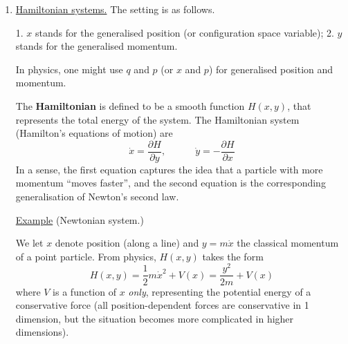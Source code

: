 \documentclass[11pt, letterpaper, oneside]{article}     %
\numberwithin{equation}{subsection}
\theoremstyle{definition}
\numberwithin{theorem}{section}
\theoremstyle{remark}
\begin{document}
\begin{enumerate}
  Now let us consider the exact solution curves to the nonlinear system. To solve for these, we find the autonomous system
  \begin{equation}
    \frac{dy}{dx} = \frac{dy/dt}{dx/dt} = \frac{y(-1+x)}{x(2-y)} = \left(\frac{y}{2-y}\right)\left(\frac{-1+x}{x}\right)
  \end{equation}
  Luckily, this equation is fairly easy to solve, as it is separable. We rearrange and simplify to get
  \begin{equation}
    \left(\frac{2}{y} - 1\right)dy = \left(\frac{-1}{x} + 1\right)dx,
  \end{equation}
  and integrating, we have
  \begin{equation}
    2\ln y - y = -\ln x + x + C.
  \end{equation}
  The absolute values are ignored because $x$ and $y$ represent populations in this model; we are not considering negative $x$ and $y$. We can capture these solution curves by writing them as the level curves of a function $H(x,y)$, by writing
  \begin{equation}
    H(x,y) = 2\ln y - y + \ln x - x.
  \end{equation}

  \medskip

\item \underline{Hamiltonian systems.} The setting is as follows.

  1. $x$ stands for the generalised position (or configuration space variable);
  2. $y$ stands for the generalised momentum.

  In physics, one might use $q$ and $p$ (or $x$ and $p$) for generalised position and momentum.

  The \textbf{Hamiltonian} is defined to be a smooth function $H(x,y)$, that represents the total energy of the system. The Hamiltonian system (Hamilton's equations of motion) are
  \begin{equation}
    \dot x = \frac{\partial H}{\partial y},\quad\quad\quad
    \dot y = -\frac{\partial H}{\partial x}
  \end{equation}
  In a sense, the first equation captures the idea that a particle with more momentum ``moves faster'', and the second equation is the corresponding generalisation of Newton's second law.

  \medskip
  \underline{Example} (Newtonian system.)

  We let $x$ denote position (along a line) and $y = m\dot x$ the classical momentum of a point particle. From physics, $H(x,y)$ takes the form
  \begin{equation}
    H(x,y) = \frac{1}{2}m\dot x^2 + V(x)
    = \frac{y^2}{2m} + V(x)
  \end{equation}
  where $V$ is a function of $x$ \emph{only}, representing the potential energy of a conservative force (all position-dependent forces are conservative in 1 dimension, but the situation becomes more complicated in higher dimensions).


\end{enumerate}
\end{document}
